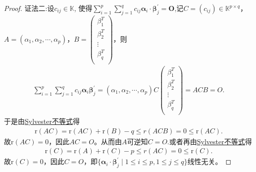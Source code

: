 \documentclass[../../main.tex]{subfiles}%
\begin{document}
\begin{proof}
{\color{blue}证法二:}设\(c_{ij}\in\mathbb{K}\), 使得\(\sum_{i = 1}^{p}\sum_{j = 1}^{q}c_{ij}\boldsymbol{\alpha}_{i}\cdot\boldsymbol{\beta}_{j}^{\prime}=\boldsymbol{O}\),记$C=( c_{ij} ) \in \mathbb{K} ^{p\times q}$，$A=( \alpha _1,\alpha _2,\cdots ,\alpha _p )$，$B=\begin{pmatrix}
\beta _{1}^{T}\\
\beta _{2}^{T}\\
\vdots\\
\beta _{q}^{T}\\
\end{pmatrix}$，则
\begin{align*}
\sum_{i=1}^p{\sum_{j=1}^q{c_{ij}\boldsymbol{\alpha }_i}}\boldsymbol{\beta }_{j}^{\prime}=(\alpha _1,\alpha _2,\cdots ,\alpha _p ) C\begin{pmatrix}
\beta _{1}^{T}\\
\beta _{2}^{T}\\
\vdots\\
\beta _{q}^{T}\\
\end{pmatrix}=ACB=O.
\end{align*}
于是由\hyperref[proposition:Sylvester(西尔维斯特)不等式]{Sylvester不等式}得
\begin{align*}
\mathrm{r}( AC ) =\mathrm{r}( AC ) +\mathrm{r}( B ) -q\leqslant r( ACB ) =0\leqslant \mathrm{r}( AC ).
\end{align*}
故$\mathrm{r}( AC )=0$，因此$AC=O$。从而由$A$可逆知$C=O$.或者再由\hyperref[proposition:Sylvester(西尔维斯特)不等式]{Sylvester不等式}得
\begin{align*}
\mathrm{r}( C ) =\mathrm{r}( A ) +\mathrm{r}( C ) -p\leqslant r( AC ) =0\leqslant \mathrm{r}( C ).
\end{align*}
故$\mathrm{r}( C )=0$，因此$C=O$，即$\{\boldsymbol{\alpha }_i\cdot \boldsymbol{\beta }_{j}^{\prime}\mid 1\leqslant i\leqslant p,1\leqslant j\leqslant q\}$线性无关。

\end{proof}
\end{document}
